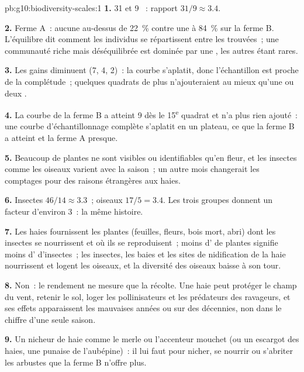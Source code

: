 \begin{solution}{pb:g10:biodiversity-scales:1}
\textbf{1.} 31 et 9 ~: rapport $31/9 \approx 3.4$.

\textbf{2.} Ferme A~: aucune  au-dessus de 22~\% contre une à
84~\% sur la ferme B. L'équilibre dit comment les individus se
répartissent entre les  trouvées~; une communauté riche mais
déséquilibrée est dominée par une , les autres étant rares.

\textbf{3.} Les gains diminuent (7, 4, 2)~: la courbe s'aplatit, donc
l'échantillon est proche de la complétude~; quelques quadrats de plus
n'ajouteraient au mieux qu'une ou deux .

\textbf{4.} La courbe de la ferme B a atteint 9 dès le
15\textsuperscript{e} quadrat et n'a plus rien ajouté~: une courbe
d'échantillonnage complète s'aplatit en un plateau, ce que la ferme B
a atteint et la ferme A presque.

\textbf{5.} Beaucoup de plantes ne sont visibles ou identifiables qu'en
fleur, et les insectes comme les oiseaux varient avec la saison~; un
autre mois changerait les comptages pour des raisons étrangères aux
haies.

\textbf{6.} Insectes $46/14 \approx 3.3$~; oiseaux $17/5 = 3.4$. Les
trois groupes donnent un facteur d'environ 3~: la même histoire.

\textbf{7.} Les haies fournissent les plantes (feuilles, fleurs, bois
mort, abri) dont les insectes se nourrissent et où ils se
reproduisent~; moins d' de plantes signifie moins d'
d'insectes~; les insectes, les baies et les sites de nidification de la
haie nourrissent et logent les oiseaux, et la diversité des oiseaux
baisse à son tour.

\textbf{8.} Non~: le rendement ne mesure que la récolte. Une haie peut
protéger le champ du vent, retenir le sol, loger les pollinisateurs et
les prédateurs des ravageurs, et ses effets apparaissent les mauvaises
années ou sur des décennies, non dans le chiffre d'une seule saison.

\textbf{9.} Un nicheur de haie comme le merle ou l'accenteur mouchet
(ou un escargot des haies, une punaise de l'aubépine)~: il lui faut
pour nicher, se nourrir ou s'abriter les arbustes que la ferme B
n'offre plus.


\end{solution}
